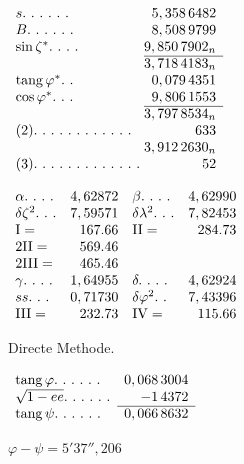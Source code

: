 \begin{minipage}[t]{.29\linewidth}\vspace{0pt}\centering
\(\begin{array}{l@{\;}r}
s\ldotp\,\ldotp\,\ldotp\,\ldotp\,\ldotp\,\ldotp&5,358\,6482\\
B\ldotp\,\ldotp\,\ldotp\,\ldotp\,\ldotp\,\ldotp&8,508\,9799\\
\sin\zeta^*\ldotp\,\ldotp\,\ldotp\,\ldotp&9,850\,7902_n\\\cline{2-2}
&3,718\,4183_n\\
\operatorname{tang}\varphi^*\ldotp\,\ldotp&0,079\,4351\\
\cos\varphi^*\ldotp\,\ldotp\,\ldotp&9,806\,1553\\\cline{2-2}
&3,797\,8534_n\\
(2)\ldotp\,\ldotp\,\ldotp\,\ldotp\,\ldotp\,\ldotp\,\ldotp\,\ldotp\,\ldotp\,\ldotp\,\ldotp\,\ldotp&633\\
&3,912\,2630_n\\
(3)\ldotp\,\ldotp\,\ldotp\,\ldotp\,\ldotp\,\ldotp\,\ldotp\,\ldotp\,\ldotp\,\ldotp\,\ldotp\,\ldotp\,\ldotp&52
\end{array}\)
\end{minipage}\hfill
\begin{minipage}[t]{.39\linewidth}\vspace{0pt}\centering
\(\begin{array}{lr@{\quad}lr}
\alpha\ldotp\,\ldotp\,\ldotp\,\ldotp&4,62872&\beta\ldotp\,\ldotp\,\ldotp\,\ldotp&4,62990\\
\delta\zeta^2\ldotp\,\ldotp\,\ldotp&7,59571&\delta\lambda^2\ldotp\,\ldotp\,\ldotp&7,82453\\
\mathrm{I}=&167.66&\mathrm{II}=&284.73\\
2\mathrm{II}=&569.46&&\\
2\mathrm{III}=&465.46&&\\
\gamma\ldotp\,\ldotp\,\ldotp\,\ldotp&1,64955&\delta\ldotp\,\ldotp\,\ldotp\,\ldotp&4,62924\\
ss\ldotp\,\ldotp\,\ldotp&0,71730&\delta\varphi^2\ldotp\,\ldotp&7,43396\\
\mathrm{III}=&232.73&\mathrm{IV}=&115.66
\end{array}\)
\end{minipage}
\par{}\quad Directe Methode.
\par\medskip
\noindent\begin{minipage}[t]{.34\linewidth}\vspace{0pt}\centering
\(\begin{array}{lr}
\operatorname{tang}\varphi\ldotp\,\ldotp\,\ldotp\,\ldotp\,\ldotp\,\ldotp&0,068\,3004\\
\sqrt{1-ee}\ldotp\,\ldotp\,\ldotp\,\ldotp\,\ldotp\,\ldotp&-1\,4372\\\cline{2-2}
\operatorname{tang}\psi\ldotp\,\ldotp\,\ldotp\,\ldotp\,\ldotp\,\ldotp&0,066\,8632
\end{array}\)
\par\vspace{7ex}
\(\varphi-\psi=5'37'',206\)
\end{minipage}\hfill
